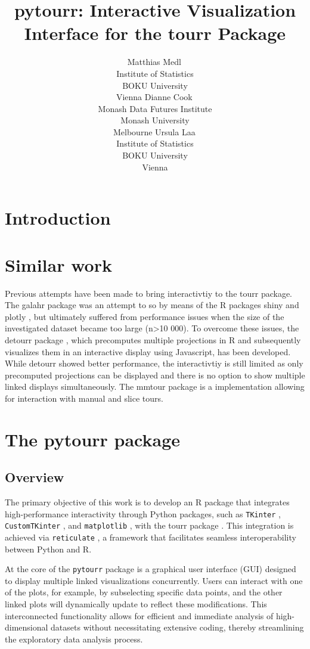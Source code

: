 \documentclass[article]{ajs}
\author{Matthias Medl\,\orcidlink{0000-0002-3354-4579}\\ Institute of Statistics \\ BOKU University \\ Vienna \And 
        Dianne Cook\,\orcidlink{0000-0002-3813-7155}\\ Monash Data Futures Institute \\ Monash University \\ Melbourne \And
        Ursula Laa\,\orcidlink{0000-0002-0249-6439}\\ Institute of Statistics \\ BOKU University \\ Vienna}
\title{pytourr: Interactive Visualization Interface for the tourr Package}
\begin{document}
\section{Introduction}


\section{Similar work}

Previous attempts have been made to bring interactivtiy to the tourr package. The galahr package \citep{galahr} was an attempt to so by means of the R packages shiny \citep{shiny} and plotly \citep{plotly}, but ultimately suffered from performance issues when the size of the investigated dataset became too large (n>10 000). To overcome these issues, the detourr package \citep{detourr}, which precomputes multiple projections in R and subsequently visualizes them in an interactive display using Javascript, has been developed. While detourr showed better performance, the interactivtiy is still limited as only precomputed projections can be displayed and there is no option to show multiple linked displays simultaneously. The mmtour package \citep{laa2023new} is a  implementation allowing for interaction with manual and slice tours.  

\section{The pytourr package}

\subsection{Overview}

The primary objective of this work is to develop an R package that integrates high-performance interactivity through Python packages, such as \texttt{TKinter} \citep{lundh1999introduction}, \texttt{CustomTKinter} \citep{schimansky24}, and \texttt{matplotlib} \citep{Hunter:2007}, with the tourr package \citep{tourr}. This integration is achieved via \texttt{reticulate} \citep{reticulate}, a framework that facilitates seamless interoperability between Python and R.

At the core of the \texttt{pytourr} package is a graphical user interface (GUI) designed to display multiple linked visualizations concurrently. Users can interact with one of the plots, for example, by subselecting specific data points, and the other linked plots will dynamically update to reflect these modifications. This interconnected functionality allows for efficient and immediate analysis of high-dimensional datasets without necessitating extensive coding, thereby streamlining the exploratory data analysis process.
\end{document}
